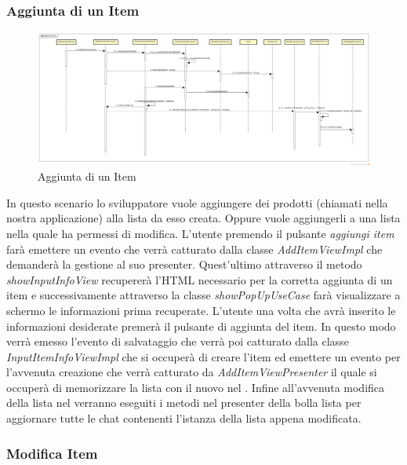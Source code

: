 \subsubsection{Aggiunta di un Item}

\label{Aggiunta di un Item}
\begin{figure}[H]
	\centering
	\includegraphics[width=\textwidth]{Sezioni/Diagrammi/img_app/aggiunta_item.jpg}
	\caption{Aggiunta di un Item}
\end{figure}

In questo scenario lo sviluppatore vuole aggiungere dei prodotti (chiamati  nella nostra applicazione) alla lista da esso creata. Oppure vuole aggiungerli a una lista nella quale ha permessi di modifica. L'utente premendo il pulsante \textit{aggiungi item} farà emettere un evento che verrà catturato dalla classe \textit{AddItemViewImpl} che demanderà la gestione al suo presenter. Quest'ultimo attraverso il metodo \textit{showInputInfoView} recupererà l'HTML necessario per la corretta aggiunta di un item e successivamente attraverso la classe \textit{showPopUpUseCase} farà visualizzare a schermo le informazioni prima recuperate. L'utente una volta che avrà inserito le informazioni desiderate premerà il pulsante di aggiunta del item. In questo modo verrà emesso l'evento di salvataggio che verrà poi catturato dalla classe \textit{InputItemInfoViewImpl} che si occuperà di creare l'item ed emettere un evento per l'avvenuta creazione che verrà catturato da \textit{AddItemViewPresenter} il quale si occuperà di memorizzare la  lista con il nuovo  nel . Infine all'avvenuta modifica della lista nel  verranno eseguiti i metodi nel presenter della bolla lista per aggiornare tutte le chat contenenti l'istanza della lista appena modificata. 




\subsubsection{Modifica Item}

